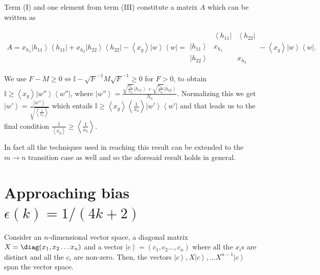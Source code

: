 \documentclass{theoretics}
\begin{document}
Term (I) and one element from term (III) constitute a
matrix $A$ which can be written as \begin{small}
\begin{align*}
A  =x_{h_{1}}\left|h_{11}\right\rangle \left\langle h_{11}\right|+x_{h_{2}}\left|h_{22}\right\rangle \left\langle h_{22}\right|-\left\langle x_{g}\right\rangle \left|w\right\rangle \left\langle w\right| =\begin{array}{c|cc}
& \left\langle h_{11}\right| & \left\langle h_{22}\right|\\
\hline \left|h_{11}\right\rangle  & x_{h_{1}}\\
\left|h_{22}\right\rangle  &  & x_{h_{2}}
\end{array}-\left\langle x_{g}\right\rangle \left|w\right\rangle \left\langle w\right|.
\end{align*}
\end{small}
We use 
$F-M\ge0\iff\mathbb{I}-\sqrt{F}^{-1}M\sqrt{F}^{-1}\ge0$ for $F>0$, to obtain $\mathbb{I}\ge\left\langle x_{g}\right\rangle \left|w''\right\rangle \left\langle w''\right|$,
where $\left|w''\right\rangle =\frac{\sqrt{\frac{p_{h_{1}}}{x_{h_{1}}}}\left|h_{11}\right\rangle +\sqrt{\frac{p_{h_{2}}}{x_{h_{2}}}}\left|h_{22}\right\rangle }{N_{h}}$.
Normalizing this we get $\left|w'\right\rangle =\frac{\left|w''\right\rangle }{\sqrt{\left\langle \frac{1}{x_{h}}\right\rangle }}$
which entails $\mathbb{I}\ge\left\langle x_{g}\right\rangle \left\langle \frac{1}{x_{h}}\right\rangle \left|w'\right\rangle \left\langle w'\right|$
and that leads us to the final condition 
$
\frac{1}{\left\langle x_{g}\right\rangle }\ge\left\langle \frac{1}{x_{h}}\right\rangle .
$

In fact all the techniques used in reaching this result can be extended
to the $m\to n$ transition case as well and so the aforesaid result
holds in general.



\section{Approaching bias  \texorpdfstring{$\epsilon(k)=1/(4k+2)$}{epsilon(k)=1/(4k+2)}}
\label{sec:appendalgebraicanalytic}
\begin{lemma}
	\label{lem:spanningLemma}Consider an $n$-dimensional vector space, a diagonal matrix $X=\diag(x_{1},x_{2}\dots x_{n})$ and a vector
	$\left|c\right\rangle =(c_{1},c_{2}\dots,c_{n})$ where all the $x_{i}$s
	are distinct and all the $c_{i}$ are non-zero. Then, the vectors $\left|c\right\rangle ,X\left|c\right\rangle ,\dots X^{n-1}\left|c\right\rangle $
	span the vector space.
\end{lemma}
\end{document}
